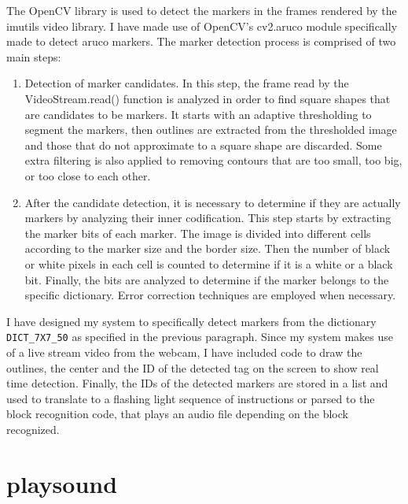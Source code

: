 \documentclass[oneside,%
                    author={Malak Hajji},
                    degree={BSc},
                    title={Designing An Accessible Computational Toolkit For Students},
                  subtitle={With Mixed Visual Abilities}]{dissertation}
\begin{document}
The OpenCV library is used to detect the markers in the frames rendered by the imutils video library. I have made use of OpenCV’s cv2.aruco module specifically made to detect aruco markers. The marker detection process is comprised of two main steps:
\begin{enumerate}
    \item Detection of marker candidates. In this step, the frame read by the VideoStream.read() function  is analyzed in order to find square shapes that are candidates to be markers. It starts with an adaptive thresholding to segment the markers, then outlines are extracted from the thresholded image and those that do not approximate to a square shape are discarded. Some extra filtering is also applied to removing contours that are too small, too big, or too close to each other.
    \item After the candidate detection, it is necessary to determine if they are actually markers by analyzing their inner codification. This step starts by extracting the marker bits of each marker. The image is divided into different cells according to the marker size and the border size. Then the number of black or white pixels in each cell is counted to determine if it is a white or a black bit. Finally, the bits are analyzed to determine if the marker belongs to the specific dictionary. Error correction techniques are employed when necessary.
\end{enumerate}
I have designed my system to specifically detect markers from the dictionary \texttt{DICT\_7X7\_50} as specified in the previous paragraph. Since my system makes use of a live stream video from the webcam, I have included code to draw the outlines, the center and the ID of the detected tag on the screen to show real time detection. 
Finally, the IDs of the detected markers are stored in a list and used to translate to a flashing light sequence of instructions or parsed to the block recognition code, that plays an audio file depending on the block recognized.

\section{playsound}
\end{document}
